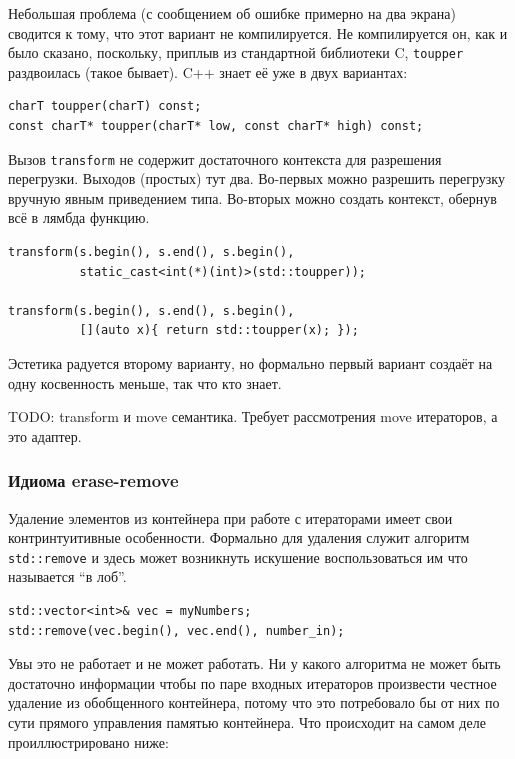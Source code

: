 \documentclass[a4paper,12pt,oneside]{article}
\begin{document}
Небольшая проблема (с сообщением об ошибке примерно на два экрана) сводится к тому, что этот вариант не компилируется. Не компилируется он, как и было сказано, поскольку, приплыв из стандартной библиотеки C, \lstinline!toupper! раздвоилась (такое бывает). C++ знает её уже в двух вариантах:

\begin{lstlisting}
charT toupper(charT) const;
const charT* toupper(charT* low, const charT* high) const;
\end{lstlisting}

Вызов \lstinline!transform! не содержит достаточного контекста для разрешения перегрузки. Выходов (простых) тут два. Во-первых можно разрешить перегрузку вручную явным приведением типа. Во-вторых можно создать контекст, обернув всё в лямбда функцию.

\begin{lstlisting}
transform(s.begin(), s.end(), s.begin(),
          static_cast<int(*)(int)>(std::toupper));

transform(s.begin(), s.end(), s.begin(), 
          [](auto x){ return std::toupper(x); });
\end{lstlisting}

Эстетика радуется второму варианту, но формально первый вариант создаёт на одну косвенность меньше, так что кто знает. 

TODO: transform и move семантика. Требует рассмотрения move итераторов, а это адаптер.

\subsubsection{Идиома erase-remove}

Удаление элементов из контейнера при работе с итераторами имеет свои контринтуитивные особенности. Формально для удаления служит алгоритм \lstinline!std::remove! и здесь может возникнуть искушение воспользоваться им что называется ``в лоб''.

\begin{lstlisting}
std::vector<int>& vec = myNumbers;
std::remove(vec.begin(), vec.end(), number_in);
\end{lstlisting}

Увы это не работает и не может работать. Ни у какого алгоритма не может быть достаточно информации чтобы по паре входных итераторов произвести честное удаление из обобщенного контейнера, потому что это потребовало бы от них по сути прямого управления памятью контейнера. Что происходит на самом деле проиллюстрировано ниже:
\end{document}
